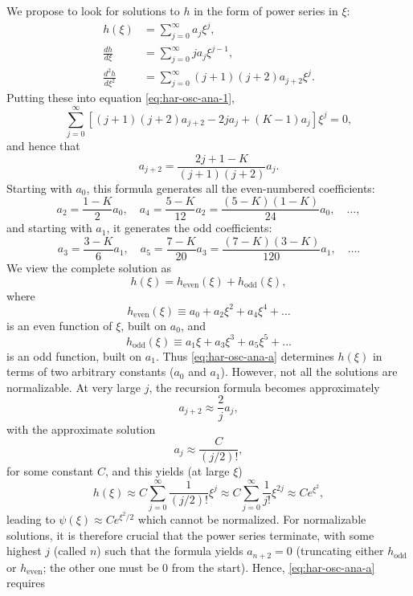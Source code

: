 \documentclass{article}
\begin{document}
We propose to look for solutions to $h$ in the form of power series in $\xi$:
\begin{align*} \label{eq:har-osc-ana-h-1}
  h(\xi) &= \sum_{j=0}^{\infty} a_j\xi^j, \\
  \frac{dh}{d\xi} &= \sum_{j=0}^{\infty} ja_j\xi^{j-1}, \\
  \frac{d^2h}{d\xi^2} &= \sum_{j=0}^{\infty} (j+1)(j+2)a_{j+2}\xi^j.
\end{align*}
Putting these into equation \eqref{eq:har-osc-ana-1},
\begin{equation} \label{eq:har-osc-ana-4}
  \sum_{j=0}^{\infty} [(j+1)(j+2)a_{j+2} - 2ja_j + (K - 1)a_j]\xi^j = 0,
\end{equation}
and hence that
\begin{equation} \label{eq:har-osc-ana-a}
  a_{j+2} = \frac{2j + 1 - K}{(j+1)(j+2)}a_j.
\end{equation}
Starting with $a_0$, this formula generates all the even-numbered coefficients:
\[
  a_2 = \frac{1 - K}{2}a_0, \quad
  a_4 = \frac{5 - K}{12}a_2 = \frac{(5 - K)(1 - K)}{24}a_0, \quad
  \ldots,
\] and starting with $a_1$, it generates the odd coefficients: \[
  a_3 = \frac{3 - K}{6}a_1, \quad
  a_5 = \frac{7 - K}{20}a_3 = \frac{(7 - K)(3 - K)}{120}a_1, \quad
  \ldots.
\] We view the complete solution as
\begin{equation} \label{eq:har-osc-ana-h-2}
  h(\xi) = h_{\mathrm{even}}(\xi) + h_{\mathrm{odd}}(\xi),
\end{equation} where \[
  h_{\mathrm{even}}(\xi) \equiv a_0 + a_2\xi^2 + a_4\xi^4 + \ldots
\] is an even function of $\xi$, built on $a_0$, and \[
h_{\mathrm{odd}}(\xi) \equiv a_1\xi + a_3\xi^3 + a_5\xi^5 + \ldots
\] is an odd function, built on $a_1$. Thus \eqref{eq:har-osc-ana-a} determines
$h(\xi)$ in terms of two arbitrary constants ($a_0$ and $a_1$). However, not
all the solutions are normalizable. At very large $j$, the recursion formula
becomes approximately \[
  a_{j+2} \approx \frac{2}{j}a_j,
\] with the approximate solution \[
  a_j \approx \frac{C}{(j/2)!},
\] for some constant $C$, and this yields (at large $\xi$) \[
  h(\xi)
  \approx C\sum_{j=0}^{\infty} \frac{1}{(j/2)!}\xi^j
  \approx C\sum_{j=0}^{\infty} \frac{1}{j!}\xi^{2j}
  \approx Ce^{\xi^2},
\] leading to $\psi(\xi) \approx Ce^{\xi^2/2}$ which cannot be normalized. For
normalizable solutions, it is therefore crucial that the power series
terminate, with some highest $j$ (called $n$) such that the formula yields
$a_{n+2} = 0$ (truncating either $h_{\mathrm{odd}}$ or $h_{\mathrm{even}}$; the
other one must be 0 from the start). Hence, \eqref{eq:har-osc-ana-a} requires
\end{document}
